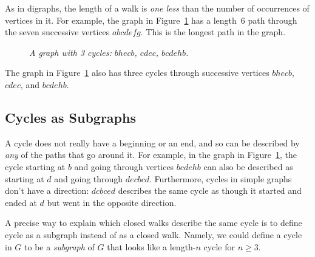 As in digraphs, the length of a walk is \emph{one less} than the
number of occurrences of vertices in it.  For example, the graph in
Figure~\ref{dg} has a length~6 path through the seven successive
vertices $abcdefg$.  This is the longest path in the graph.
\begin{figure}
\caption{\em A graph with 3 cycles: $bhecb$,
$cdec$, $bcdehb$.}
\label{dg}
\end{figure}
The graph in Figure~\ref{dg} also has three cycles through successive vertices $bhecb$,
$cdec$, and $bcdehb$.

\iffalse
The vertex sequence $bcdecb$ describes a closed walk in the graph
in Figure~\ref{dg}.  This sequence suggests indicates that the walk
begins and ends at vertex $b$, but

All the paths that describe the same closed walk have the same length
which is defined to be the \term{length of the walk}.  (Note that this
implies that going around the same walk twice is considered to be
different than going around it once.)

More precisely, a cycle is a
closed walk that can be described by a walk of length at least three whose
vertices are all different except for the beginning and end vertices.
So in contrast to \emph{paths}, the length of a \emph{cycle} is the
\emph{same} as the number of distinct vertices that appear in it.

\footnote{Technically speaking, we haven't ever defined what a cycle
\emph{is}, only how to describe it with paths.  But we won't need an
abstract definition of cycle, since all that matters about a cycle is which
paths describe it.}
\fi

\subsection{Cycles as Subgraphs}

A cycle does not really have a beginning or an end, and so can be
described by \emph{any} of the paths that go around it.  For example,
in the graph in Figure~\ref{dg}, the cycle starting at $b$ and going
through vertices $bcdehb$ can also be described as starting at $d$ and
going through $decbcd$.  Furthermore, cycles in simple graphs don't
have a direction: $dcbced$ describes the same cycle as though it
started and ended at $d$ but went in the opposite direction.

A precise way to explain which closed walks describe the same cycle is
to define cycle as a subgraph instead of as a closed walk.  Namely, we
could define a cycle in $G$ to be a \emph{subgraph} of $G$ that looks
like a length-$n$ cycle for $n \ge 3$.

